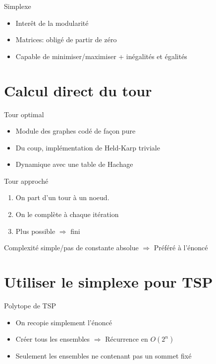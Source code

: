 \documentclass{beamer}
\begin{document}
\begin{frame}{Simplexe}
\begin{itemize}
\item Interêt de la modularité

\item Matrices: obligé de partir de zéro

\item Capable de minimiser/maximiser + inégalités et égalités
\end{itemize}
\end{frame}

\section{Calcul direct du tour}
\begin{frame}{Tour optimal}
\begin{itemize}
\item Module des graphes codé de façon pure

\item Du coup, implémentation de Held-Karp triviale

\item Dynamique avec une table de Hachage
\end{itemize}
\end{frame}

\begin{frame}{Tour approché}
\begin{enumerate}
\item On part d'un tour à un noeud.

\item On le complète à chaque itération

\item Plus possible $\Rightarrow$ fini
\end{enumerate}
Complexité simple/pas de constante absolue $\Rightarrow$ Préféré à l'énoncé
\end{frame}

\section{Utiliser le simplexe pour TSP}
\begin{frame}{Polytope de TSP}
\begin{itemize}
\item On recopie simplement l'énoncé

\item Créer tous les ensembles $\Rightarrow$ Récurrence en $O(2^{n})$

\item Seulement les ensembles ne contenant pas un sommet fixé
\end{itemize}
\end{frame}
\end{document}
